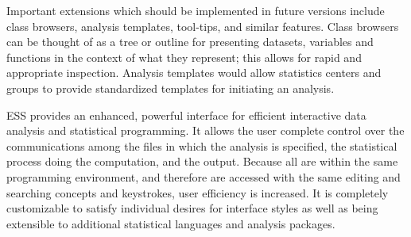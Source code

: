 \documentclass{article}
\newcommand*{\SAS}{\textsc{SAS}}
\begin{document}


Important extensions which should be implemented in future
versions include class browsers, analysis templates, tool-tips, and
similar features.  Class browsers can be thought of as a tree or
outline for presenting datasets, variables and functions in the
context of what they represent; this allows for rapid and appropriate
inspection.  Analysis templates would allow statistics centers and
groups to provide standardized templates for initiating an analysis.

ESS provides 
an enhanced, powerful interface for efficient interactive data
analysis and statistical programming.  
It allows the user complete control over the communications among the
files in which the analysis is specified, the statistical process doing
the computation, and the output.  Because all are within the same programming
environment, and therefore are accessed with the same
editing and searching concepts and keystrokes, user efficiency is increased.
It is completely customizable
to satisfy individual desires for interface styles as well as being
extensible to additional statistical languages and analysis packages.
\end{document}

